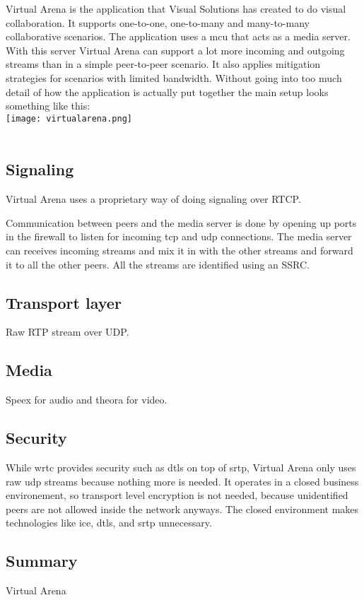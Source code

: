 Virtual Arena is the application that Visual Solutions has created to do visual collaboration\cite{VirtualArena}. It supports one-to-one, one-to-many and many-to-many collaborative scenarios. The application uses a \gls{mcu} that acts as a media server. With this server Virtual Arena can support a lot more incoming and outgoing streams than in a simple peer-to-peer scenario. It also applies mitigation strategies for scenarios with limited bandwidth. Without going into too much detail of how the application is actually put together the main setup looks something like this: 
\\
\texttt{[image: virtualarena.png]}
\\
\\

\subsection{Signaling}
Virtual Arena uses a proprietary way of doing signaling over RTCP.

Communication between peers and the media server is done by opening up ports in the firewall to listen for incoming tcp and udp connections. The media server can receives incoming streams and mix it in with the other streams and forward it to all the other peers. All the streams are identified using an SSRC.


\subsection{Transport layer}
Raw RTP stream over UDP.

\subsection{Media}
Speex for audio and theora for video.

\subsection{Security}
While \gls{wrtc} provides security such as \gls{dtls} on top of \gls{srtp}, Virtual Arena only uses raw \gls{udp} streams because nothing more is needed. It operates in a closed business environement, so transport level encryption is not needed, because unidentified peers are not allowed inside the network anyways.  The closed environment makes technologies like \gls{ice}, \gls{dtls}, and {srtp} unnecessary.

\subsection*{Summary}


Virtual Arena